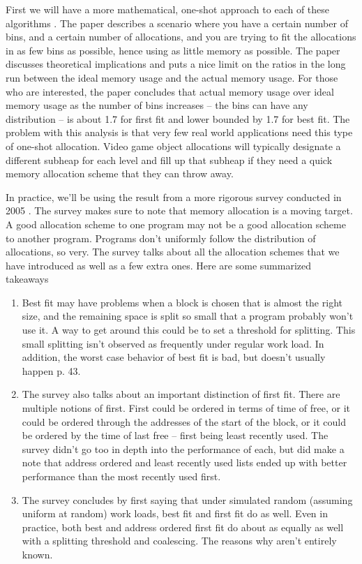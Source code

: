 First we will have a more mathematical, one-shot approach to each of these algorithms \cite{Garey:1972:WAM:800152.804907}. The paper describes a scenario where you have a certain number of bins, and a certain number of allocations, and you are trying to fit the allocations in as few bins as possible, hence using as little memory as possible.
The paper discusses theoretical implications and puts a nice limit on the ratios in the long run between the ideal memory usage and the actual memory usage.
For those who are interested, the paper concludes that actual memory usage over ideal memory usage as the number of bins increases -- the bins can have any distribution -- is about 1.7 for first fit and lower bounded by 1.7 for best fit.
The problem with this analysis is that very few real world applications need this type of one-shot allocation.
Video game object allocations will typically designate a different subheap for each level and fill up that subheap if they need a quick memory allocation scheme that they can throw away.

In practice, we'll be using the result from a more rigorous survey conducted in 2005 \cite{10.1007/3-540-60368-9_19}.
The survey makes sure to note that memory allocation is a moving target.
A good allocation scheme to one program may not be a good allocation scheme to another program.
Programs don't uniformly follow the distribution of allocations, so very.
The survey talks about all the allocation schemes that we have introduced as well as a few extra ones.
Here are some summarized takeaways

\begin{enumerate}
\item Best fit may have problems when a block is chosen that is almost the right size, and the remaining space is split so small that a program probably won't use it.
  A way to get around this could be to set a threshold for splitting.
  This small splitting isn't observed as frequently under regular work load.
  In addition, the worst case behavior of best fit is bad, but doesn't usually happen p. 43.
\item The survey also talks about an important distinction of first fit.
  There are multiple notions of first.
  First could be ordered in terms of time of free, or it could be ordered through the addresses of the start of the block, or it could be ordered by the time of last free -- first being least recently used.
  The survey didn't go too in depth into the performance of each, but did make a note that address ordered and least recently used lists ended up with better performance than the most recently used first.
\item The survey concludes by first saying that under simulated random (assuming uniform at random) work loads, best fit and first fit do as well. Even in practice, both best and address ordered first fit do about as equally as well with a splitting threshold and coalescing. The reasons why aren't entirely known.
\end{enumerate}

